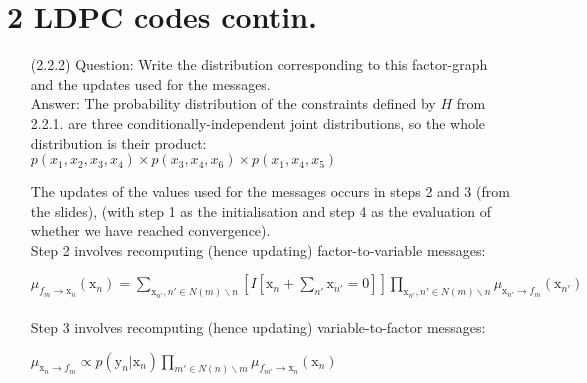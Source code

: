 \documentclass[a4paper,12pt]{article}
\begin{document}
\begin{enumerate}
\end{enumerate}
\clearpage

\section*{2 LDPC codes contin.}
\begin{enumerate}
\item[(2.2.2)] 
Question: Write the distribution corresponding to this factor-graph and the updates used for the messages.\\
Answer: The probability distribution of the constraints defined by $H$ from 2.2.1. are three conditionally-independent joint distributions, so the whole distribution is their product:\\
$p(x_1, x_2, x_3, x_4) \times p(x_3, x_4, x_6) \times p(x_1, x_4, x_5)$

The updates of the values used for the messages occurs in steps 2 and 3 (from the slides), (with step 1 as the initialisation and step 4 as the evaluation of whether we have reached convergence).\\
Step 2 involves recomputing (hence updating) factor-to-variable messages:

$\mu_{f_m \rightarrow \text{x}_n}(\text{x}_n) = \sum\limits_{\text{x}_{n'}, n' \in N(m) \backslash n} \left[ I\left[\text{x}_n + \sum\limits_{n'} \text{x}_{n'} = 0\right] \right] \prod\limits_{\text{x}_{n'}, n' \in N(m) \backslash n} \mu_{\text{x}_{n'} \rightarrow f_m}(\text{x}_{n'})$\\\\

Step 3 involves recomputing (hence updating) variable-to-factor messages:

$\mu_{\text{x}_n \rightarrow f_m} \propto p(\text{y}_n|\text{x}_n) \prod\limits_{m' \in N(n) \backslash m} \mu_{f_{m'} \rightarrow \text{x}_n}(\text{x}_n)$\\

\end{enumerate}
\clearpage
\end{document}
